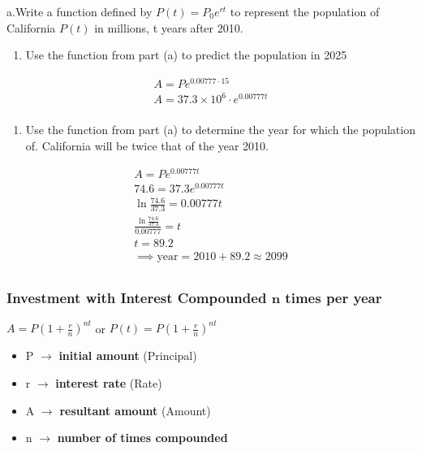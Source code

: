 \documentclass{book}
\begin{document}
a.Write a function defined by \(P(t)=P_{0}e^{rt}\) to represent the
population of California \(P(t)\) in millions, t years after 2010.

\begin{enumerate}
	\def\labelenumi{\alph{enumi}.}
	\setcounter{enumi}{1}
	\tightlist
	\item
	      Use the function from part (a) to predict the population in 2025
\end{enumerate}


	\begin{align}
		A=Pe^{0.00777 \cdot 15} \\ A=37.3 \times 10^6 \cdot e^{0.00777t} \\
	\end{align}


\begin{enumerate}
	\def\labelenumi{\alph{enumi}.}
	\setcounter{enumi}{2}
	\tightlist
	\item
	      Use the function from part (a) to determine the year for which the
	      population of. California will be twice that of the year 2010.
\end{enumerate}


	\begin{align}
		A=Pe^{0.00777t} \\ 74.6 = 37.3 e^{0.00777t} \\ \ln \frac{74.6}{37.3} = 0.00777t \\ \frac{\ln \frac{74.6}{37.3}}{0.00777} = t \\ t = 89.2 \\ \implies \text{year} = 2010 + 89.2 \approx 2099 \\
	\end{align}


\subsubsection{\texorpdfstring{Investment with Interest Compounded
		\(\boldsymbol{n}\) times per
		year}{Investment with Interest Compounded \textbackslash boldsymbol\{n\} times per year}}\label{investment-with-interest-compounded-boldsymboln-times-per-year}

\(A=P\left(1+\frac{r}{n}\right)^{nt}\) or
\(P(t)=P\left(1+\frac{r}{n}\right)^{nt}\)

\begin{itemize}
	\tightlist
	\item
	      P \(\rightarrow\) \textbf{initial amount} (Principal)
	\item
	      r \(\rightarrow\) \textbf{interest rate} (Rate)
	\item
	      A \(\rightarrow\) \textbf{resultant amount} (Amount)
	\item
	      n \(\rightarrow\) \textbf{number of times compounded}
\end{itemize}
\end{document}
